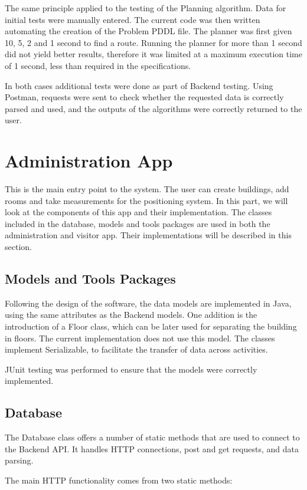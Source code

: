 The same principle applied to the testing of the Planning algorithm. Data for initial tests were manually entered. The current code was then written automating the creation of the Problem PDDL file. The planner was first given 10, 5, 2 and 1 second to find a route. Running the planner for more than 1 second did not yield better results, therefore it was limited at a maximum execution time of 1 second, less than required in the specifications.

In both cases additional tests were done as part of Backend testing. Using Postman, requests were sent to check whether the requested data is correctly parsed and used, and the outputs of the algorithms were correctly returned to the user.

\section{Administration App}
This is the main entry point to the system. The user can create buildings, add rooms and take measurements for the positioning system. In this part, we will look at the components of this app and their implementation. The classes included in the database, models and tools packages are used in both the administration and visitor app. Their implementations will be described in this section.

\subsection{Models and Tools Packages}
Following the design of the software, the data models are implemented in Java, using the same attributes as the Backend models. One addition is the introduction of a Floor class, which can be later used for separating the building in floors. The current implementation does not use this model. The classes implement Serializable, to facilitate the transfer of data across activities. 

JUnit testing was performed to ensure that the models were correctly implemented. 
\subsection{Database}
The Database class offers a number of static methods that are used to connect to the Backend API. It handles HTTP connections, post and get requests, and data parsing.

\noindent
The main HTTP functionality comes from two static methods:

